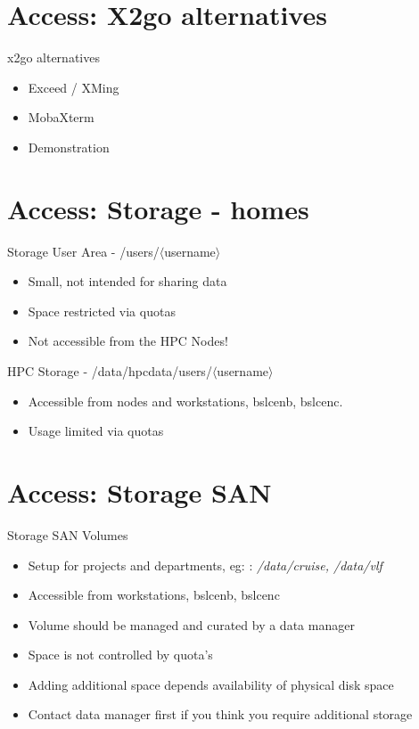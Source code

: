 {
\section{Access: X2go alternatives}
%
\begin{frame}{x2go alternatives}
\begin{itemize}
\item Exceed / XMing
\item MobaXterm
\pause
\item{{\color{red}Demonstration}}
\end{itemize}
\end{frame}
}

{
\section{Access: Storage - homes}
%
\begin{frame}{Storage}
\text User Area - /users/$\langle$username$\rangle$
\begin{itemize}
\item Small, not intended for sharing data
\item Space restricted via quotas
\item Not accessible from the HPC Nodes!
\end{itemize}
\text HPC Storage - /data/hpcdata/users/$\langle$username$\rangle$
\begin{itemize}
\item Accessible from nodes and workstations, bslcenb, bslcenc.
\item Usage limited via quotas
\end{itemize}
\end{frame}
}

{
\section{Access: Storage SAN}
%
\begin{frame}{Storage SAN Volumes}
\begin{itemize}
\item Setup for projects and departments, eg: : \textit{/data/cruise, /data/vlf}
\item Accessible from workstations, bslcenb, bslcenc
\item Volume should be managed and curated by a data manager
\item Space is not controlled by quota's
\item Adding additional space depends availability of physical disk space
\item Contact data manager first if you think you require additional storage
\end{itemize}
\end{frame}
}

